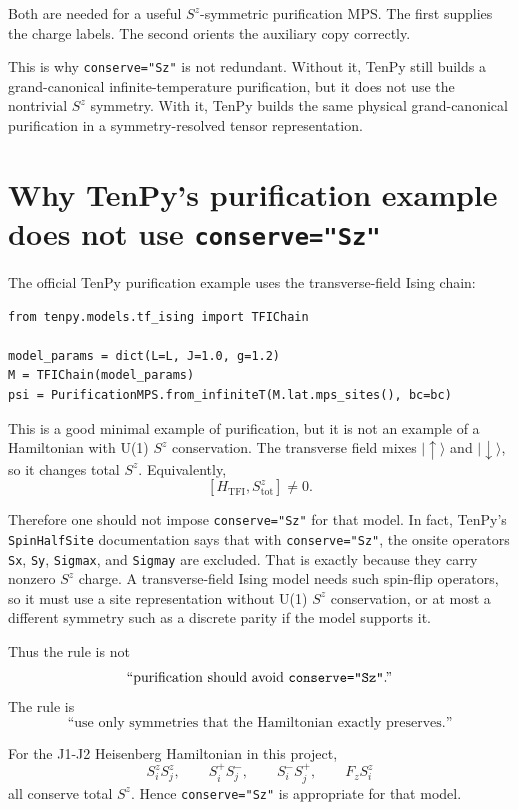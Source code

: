 \documentclass[11pt]{article}
\begin{document}
Both are needed for a useful \(S^z\)-symmetric purification MPS. The first
supplies the charge labels. The second orients the auxiliary copy correctly.

This is why \texttt{conserve="Sz"} is not redundant. Without it, TenPy still
builds a grand-canonical infinite-temperature purification, but it does not use
the nontrivial \(S^z\) symmetry. With it, TenPy builds the same physical
grand-canonical purification in a symmetry-resolved tensor representation.

\section{Why TenPy's purification example does not use \texttt{conserve="Sz"}}

The official TenPy purification example uses the transverse-field Ising chain:

\begin{Verbatim}[fontsize=\small]
from tenpy.models.tf_ising import TFIChain

model_params = dict(L=L, J=1.0, g=1.2)
M = TFIChain(model_params)
psi = PurificationMPS.from_infiniteT(M.lat.mps_sites(), bc=bc)
\end{Verbatim}

This is a good minimal example of purification, but it is not an example of a
Hamiltonian with U(1) \(S^z\) conservation. The transverse field mixes
\(|\uparrow\rangle\) and \(|\downarrow\rangle\), so it changes total \(S^z\).
Equivalently,
\[
[H_{\mathrm{TFI}},S^z_{\mathrm{tot}}]\ne 0.
\]

Therefore one should not impose \texttt{conserve="Sz"} for that model. In fact,
TenPy's \texttt{SpinHalfSite} documentation says that with
\texttt{conserve="Sz"}, the onsite operators \texttt{Sx}, \texttt{Sy},
\texttt{Sigmax}, and \texttt{Sigmay} are excluded. That is exactly because they
carry nonzero \(S^z\) charge. A transverse-field Ising model needs such
spin-flip operators, so it must use a site representation without U(1)
\(S^z\) conservation, or at most a different symmetry such as a discrete parity
if the model supports it.

Thus the rule is not
\[
\text{``purification should avoid \texttt{conserve="Sz"}.''}
\]
The rule is
\[
\text{``use only symmetries that the Hamiltonian exactly preserves.''}
\]

For the J1-J2 Heisenberg Hamiltonian in this project,
\[
S_i^zS_j^z,\qquad S_i^+S_j^-,\qquad S_i^-S_j^+,\qquad F_zS_i^z
\]
all conserve total \(S^z\). Hence \texttt{conserve="Sz"} is appropriate for
that model.
\end{document}
